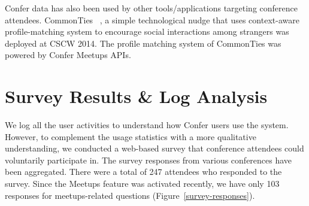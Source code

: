 \documentclass{sigchi}
\begin{document}
Confer data has also been used by other tools/applications targeting conference attendees. 
CommonTies ~\cite{Abouzied:2014:CCN:2556420.2556783}, a simple technological nudge that uses context-aware profile-matching system to encourage social interactions among strangers was deployed at CSCW 2014. The profile matching system of CommonTies was powered by Confer Meetups APIs.

\section{Survey Results \& Log Analysis}

We log all the user activities to understand how Confer users use the system. However, to complement the usage statistics with a more qualitative understanding, we conducted a web-based survey that conference attendees could voluntarily participate in. The survey responses from various conferences have been aggregated. There were a total of 247 attendees who responded to the survey. Since the Meetups feature was activated recently, we have only 103 responses for meetups-related questions (Figure~\ref{survey-responses}).
\end{document}
